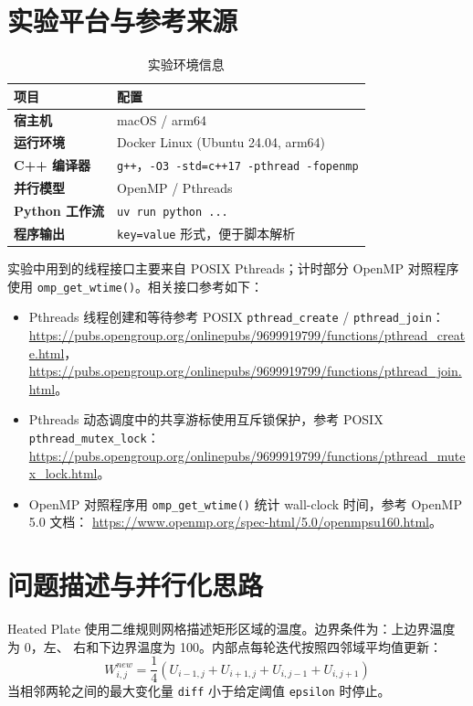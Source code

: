 \documentclass[UTF8,a4paper,12pt,fontset=none]{ctexart}
\begin{document}
\section{实验平台与参考来源}

\begin{table}[H]
  \centering
  \caption{实验环境信息}
  \renewcommand{\arraystretch}{1.2}
  \begin{tabularx}{0.92\textwidth}{>{\bfseries}p{4cm}X}
    \toprule
    项目 & 配置 \\
    \midrule
    宿主机 & macOS / arm64 \\
    运行环境 & Docker Linux (Ubuntu 24.04, arm64) \\
    C++ 编译器 & \texttt{g++}，\texttt{-O3 -std=c++17 -pthread -fopenmp} \\
    并行模型 & OpenMP / Pthreads \\
    Python 工作流 & \texttt{uv run python ...} \\
    程序输出 & \texttt{key=value} 形式，便于脚本解析 \\
    \bottomrule
  \end{tabularx}
\end{table}

实验中用到的线程接口主要来自 POSIX Pthreads；计时部分 OpenMP 对照程序使用
\texttt{omp\_get\_wtime()}。相关接口参考如下：
\begin{itemize}[leftmargin=2.2em]
  \item Pthreads 线程创建和等待参考 POSIX \texttt{pthread\_create} / \texttt{pthread\_join}：
  \url{https://pubs.opengroup.org/onlinepubs/9699919799/functions/pthread_create.html}，
  \url{https://pubs.opengroup.org/onlinepubs/9699919799/functions/pthread_join.html}。
  \item Pthreads 动态调度中的共享游标使用互斥锁保护，参考 POSIX \texttt{pthread\_mutex\_lock}：
  \url{https://pubs.opengroup.org/onlinepubs/9699919799/functions/pthread_mutex_lock.html}。
  \item OpenMP 对照程序用 \texttt{omp\_get\_wtime()} 统计 wall-clock 时间，参考 OpenMP 5.0 文档：
  \url{https://www.openmp.org/spec-html/5.0/openmpsu160.html}。
\end{itemize}

\section{问题描述与并行化思路}

Heated Plate 使用二维规则网格描述矩形区域的温度。边界条件为：上边界温度为 0，左、
右和下边界温度为 100。内部点每轮迭代按照四邻域平均值更新：
\[
W_{i,j}^{new} = \frac{1}{4}(U_{i-1,j}+U_{i+1,j}+U_{i,j-1}+U_{i,j+1})
\]
当相邻两轮之间的最大变化量 \texttt{diff} 小于给定阈值 \texttt{epsilon} 时停止。
\end{document}
